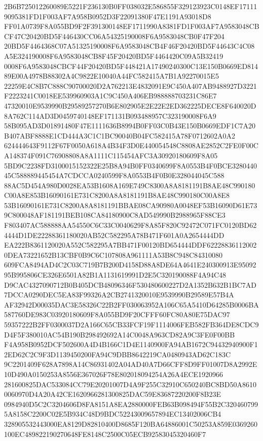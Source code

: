 \documentclass[UTF8,fontset=fandol,zihao=-4,a4paper]{ctexart}
\begin{document}
{{2B6B725012260089E5221F236130B0FF038032E586855F329123923C0148EF171119095381FD1F003AF7A958B0952D3F22091380F47E1191A93018D8
FF01A0739F8A055BD9F2F391300148EF1711990A8381FD1F003AF7A9583048CBCF47C20420BD5F446430CC06A54325190008F6A9583048CB0F47F204
20BD5F4464368C07A51325190008F6A9583048CB4F46F20420BD5F44643C4C08A5E324190008F6A9583048CB8F45F20420BD5F4464420C09A5B32419
0008F6A9583048CBCF44F20420BD5F448421A17490240300C13E150B0669ED81489E00A4978B88302A4C9822E10040A44FC582415A7B1A92270015E5
22259E4C8B7C888C90700020D2A762213E4832091E9C450A407AB9488927D3221F2223241C0018EE539960903A1C9C450A406EB988888703231C86E7
47320010E9539990B29589257270B6E802905E2E22E2ED362225DECE8F640020D8A762C114AD3D0459740148EF171131B093488957C323190008F6A9
58B095AD3D01891480F47E1111636B8994B0FF03C0B43E150B0669EDF1C7A20B407ABF8888E1CD444A3C1C1BC90040B04FC582415A78F0712602A0A2
624444643F9112F67F0050A618A4B34F3D0E440054548C8808AE2852C2FE0F00CA148374F091C76908808A8A1111C115454AFC3A30920180609F8A05
5BD9C2238FD3100015152322E25B8A94B0FF0340699F8A0553B4F0BCE328044045C588889445454A7CDCCA0240599F8A0553B4F0B0E328044045C588
88AC5D454A980D0028EA53B1608A169E749C8300A8A8181191B8AE48C990180C00A8E853B16090161E731C8200A8A8181191B8AE48C990180C00A8E8
53B16090161E731C8200A8A8181191BBAE08CA90980A0048EF53B16090D61E739C800048AF181191BEB108CA84180900C8AD549990B2988965F88CE3
F803407AC588888AA54550C6C33C0040629F8A85F820C92472C071FC0120BD624444D1DE22288361180020AB52C582295A78B471F601A0A2654444DD
EA222B8361120020A552C582295A7BB471F00120BD654444DDF622288361120020DEA73221652B13CBF0B9C6C107808A961111A53B8C948C84310080
609FCA8494AD4C2C03C719B7B200D4158D88A8DE64A4641E240300913E9509295B995806CE326E6501A82B1A1131619991D2E5C320190088F4A94C48
D9CAC4327090712B0B405DCB48096346F530480600227D2A1352B632B1BC7AD7DCCA0290DEC5EA83F99326A2CB2741320010E9539990B29589E57B4A
AF32942D00035DAC3E58326C22B2FF030063952A106C65A5410D64285B0006BA587760DE983C03920180609F8A055BD9F20CFFF60FC80A80E75DAC97
59357222B2FF0300037D2A166C65CB33FCF19F1114006FEB582FB364DE8CDC9D4F5F380010AC54B190B298492692A14C0048A963CD82A9C3FE0F00BB
F4A958B0952DCF502600A4D4B166C1D4E1140900FA94AB1672C94432940900F12ED62C2C9F3D1139450200FA94C9DBB8642219CA0480943AD62C183C
9C2201409F628A7898A14C86931402A04AD40A7D66CFF8D9FF01007D8A2992E10D490A0150253A8556E367026F78E802018094254A26A4ECE1920966
281600825DAC533084CC79E20201007D4A9F255C32910C650240BC8BD50A86100060970D4A20A42CE1620966281300825DAC59E83687220200F8B23E
0984940D5C2C3204606D8FA8151A8EA2880000FEB63B098494F55B2C3204607995A8158C2200C02E5B934C48D9BDC52243009657894EC13402006CB4
328905532443000EA8129D82810400D8685F120BA64886001C50253A859E0369260100EC489822190270648FE8148C2500C05ECB92583045320460F7
}}
\end{document}
